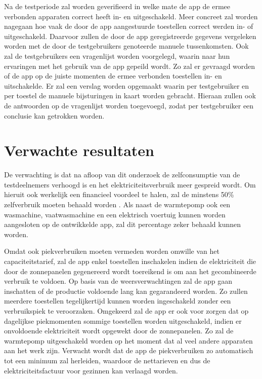 \documentclass{hogent-article}
\begin{document}
Na de testperiode zal worden geverifieerd in welke mate de app de ermee verbonden apparaten correct heeft in- en uitgeschakeld. Meer concreet zal worden nagegaan hoe vaak de door de app aangestuurde toestellen correct werden in- of uitgeschakeld. Daarvoor zullen de door de app geregistreerde gegevens vergeleken worden met de door de testgebruikers genoteerde manuele tussenkomsten. Ook zal de testgebruikers een vragenlijst worden voorgelegd, waarin naar hun ervaringen met het gebruik van de app gepeild wordt. Zo zal er gevraagd worden of de app op de juiste momenten de ermee verbonden toestellen in- en uitschakelde. Er zal een verslag worden opgemaakt waarin per testgebruiker en per toestel de manuele bijsturingen in kaart worden gebracht. Hieraan zullen ook de antwoorden op de vragenlijst worden toegevoegd, zodat per testgebruiker een conclusie kan getrokken worden.

\section{Verwachte resultaten}%
\label{sec:verwachte-resultaten}

De verwachting is dat na afloop van dit onderzoek de zelfconsumptie van de testdeelnemers verhoogd is en het elektriciteitsverbruik meer gespreid wordt. Om hieruit ook werkelijk een financieel voordeel te halen, zal de minstens 50\% zelfverbruik moeten behaald worden \autocite{Selleslagh2021}. Als naast de warmtepomp ook een wasmachine, vaatwasmachine en een elektrisch voertuig kunnen worden aangesloten op de ontwikkelde app, zal dit percentage zeker behaald kunnen worden. 

Omdat ook piekverbruiken moeten vermeden worden omwille van het capaciteitstarief, zal de app enkel toestellen inschakelen indien de elektriciteit die door de zonnepanelen gegenereerd wordt toereikend is om aan het gecombineerde verbruik te voldoen. Op basis van de weersverwachtingen zal de app gaan inschatten of de productie voldoende lang kan gegarandeerd worden. Zo zullen meerdere toestellen tegelijkertijd kunnen worden ingeschakeld zonder een verbruikspiek te veroorzaken. Omgekeerd zal de app er ook voor zorgen dat op dagelijkse piekmomenten sommige toestellen worden uitgeschakeld, indien er onvoldoende elektriciteit wordt opgewekt door de zonnepanelen. Zo zal de warmtepomp uitgeschakeld worden op het moment dat al veel andere apparaten aan het werk zijn. Verwacht wordt dat de app de piekverbruiken zo automatisch tot een minimum zal herleiden, waardoor de nettarieven en dus de elektriciteitsfactuur voor gezinnen kan verlaagd worden.
\autocite{Balakumar2023} \autocite{Gozuoglu2024}  \autocite{Tziolis2024}  \autocite{Guerra2024}  \autocite{Bozlak2024}  \autocite{Kim2023} \autocite{Hoseinpour2024}  \autocite{Volta2023} \autocite{Konsman2023} \autocite{Fluvius2023}
\end{document}
